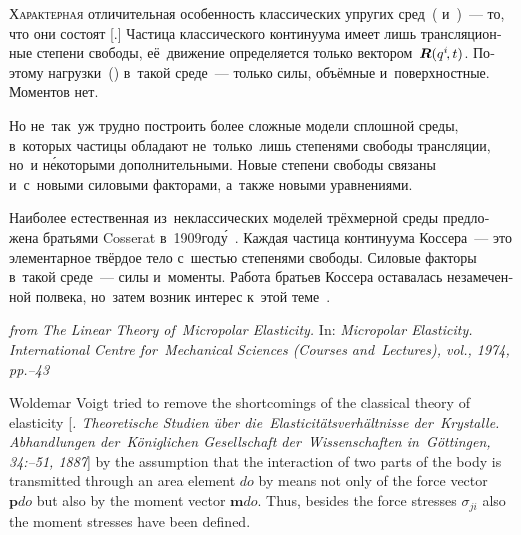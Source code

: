 \begin{otherlanguage}{russian}

\lettrine[lines=2, findent=2pt, nindent=0pt]{Х}{арактерная} отличительная особенность классических упругих сред~( и~)~--- то, что они состоят [.] Частица классического континуума имеет лишь трансляционные степени свободы, её~движение определяется только вектором~${\bm{R}(q^i \hspace{-0.15em}, t)}$. Поэтому нагрузки~() в~такой среде~--- только силы, объёмные и~поверхностные. Моментов нет.

Но не~так~уж трудно построить более сложные модели сплошной среды, в~которых частицы обладают не~только~лишь степенями свободы трансляции, но~и н\'{е}которыми дополнительными. Новые степени свободы связаны и~с~новыми силовыми факторами, а~также новыми уравнениями.

Наиболее естественная из~неклассических моделей трёхмерной среды предложена братьями Cosserat в~1909\:год\'{у}~\cite{cosserat}. Каждая частица континуума Коссера~--- это элементарное твёрдое тело с~шестью степенями свободы. Силовые факторы в~такой среде~--- силы и~моменты. Работа братьев Коссера оставалась незамеченной полвека, но~затем возник интерес к~этой теме~\cite{mindlin.tiersten, nowacki-elasticity}.

\vspace{2mm}

\begin{tcolorbox}[breakable, enhanced, colback = orange!8, before upper={\parindent3.2ex}, parbox = false]
\small%
\setlength{\abovedisplayskip}{2pt}\setlength{\belowdisplayskip}{2pt}%

\noindent \textit{from  The Linear Theory of~Micropolar Elasticity.} In: \textit{Micropolar Elasticity. International Centre for~Mechanical Sciences (Courses and~Lectures), vol., 1974, pp.\hbox{--}43}

\vspace{.5em}

Woldemar Voigt tried to remove the shortcomings of the classical theory of elasticity [\textit{. Theoretische Studien über die~Elasticitätsverhältnisse der~Krystalle. Abhandlungen der~Königlichen Gesellschaft der~Wissenschaften in~Göttingen, 34:\hbox{--}51, 1887}] by the assumption that the interaction of two parts of the body is transmitted through an area element $do$ by means not only of the force vector $\bm{p}do$ but also by the moment vector $\bm{m}do$. Thus, besides the force stresses $\sigma_{ji}$ also the moment stresses have been defined.


\end{tcolorbox}
\end{otherlanguage}
